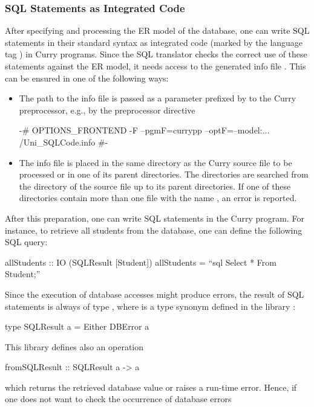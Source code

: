 \subsubsection{SQL Statements as Integrated Code}

After specifying and processing the ER model of the database,
one can write SQL statements in their standard syntax
as integrated code (marked by the language tag ) in Curry programs.
Since the SQL translator checks the correct use of these statements
against the ER model, it needs access to the generated info file
.
This can be ensured in one of the following ways:
\begin{itemize}
\item
The path to the info file is passed as a parameter prefixed by
 to the Curry preprocessor, e.g., by the preprocessor
directive
\begin{curry}
{-# OPTIONS_FRONTEND -F --pgmF=currypp  --optF=--model:$\ldots$/Uni_SQLCode.info #-}
\end{curry}
\item
The info file is placed in the same directory as the Curry source file
to be processed or in one of its parent directories.
The directories are searched from the directory of the source file
up to its parent directories.
If one of these directories contain more than one file with the
name , an error is reported.
\end{itemize}
%
After this preparation, one can write SQL statements in the Curry program.
For instance, to retrieve all students from the database, one
can define the following SQL query:
%
\begin{curry}
allStudents :: IO (SQLResult [Student])
allStudents = ``sql Select * From Student;''
\end{curry}
%
Since the execution of database accesses might produce errors,
the result of SQL statements is always of type
, where  is a type synonym
defined in the \CYS library :
%
\begin{curry}
type SQLResult a = Either DBError a
\end{curry}
%
This library defines also an operation
%
\begin{curry}
fromSQLResult :: SQLResult a -> a
\end{curry}
%
which returns the retrieved database value or raises a run-time error.
Hence, if one does not want to check the occurrence of database errors

